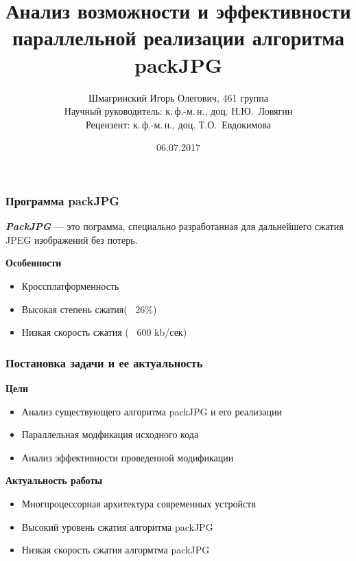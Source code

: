 \documentclass{beamer}
\title{Анализ возможности и эффективности параллельной реализации алгоритма packJPG}
\author[Шмагринский Игорь]{Шмагринский Игорь Олегович, 461 группа
  \\{\footnotesize Научный руководитель: к.\,ф.-м.\,н., доц. Н.Ю.~Ловягин}
  \\{\footnotesize Рецензент: к.\,ф.-м.\,н., доц. Т.О.~Евдокимова}
}
\institute[СПбГУ]{Санкт-Петербургский Государственный Университет\\Математико-Механический факультет\\ Кафедра Информатики}
\date{06.07.2017}
\begin{document}
    \frame{
    \titlepage
}


\begin{frame}[c]
\frametitle{Программа packJPG}

   \textbf{\emph{PackJPG}} — это пограмма, специально разработанная для дальнейшего сжатия
   JPEG изображений без потерь.

    \vspace{\baselineskip}

    \textbf{Особенности}
    \begin{itemize}
        \item{Кроссплатформенность}
        \item{Высокая степень сжатия(~ 26\%) }
        \item{Низкая скорость сжатия (~ 600 kb/сек)}
    \end{itemize}
\end{frame}


\begin{frame}\frametitle{Постановка задачи и ее актуальность}
   \textbf{Цели}
   \begin{itemize}
     \item{Анализ существующего алгоритма packJPG и его реализации}
     \item{Параллельная модфикация исходного кода}
     \item{Анализ эффективности проведенной модификации}
   \end{itemize}
   \vspace{\baselineskip}
   \textbf{Актуальность работы}
    \begin{itemize}
        \item{Многпроцессорная архитектура современных устройств}
        \item{Высокий уровень сжатия алгоритма packJPG}
        \item{Низкая скорость сжатия алгормтма packJPG}
      \end{itemize}
\end{frame}

\end{document}
